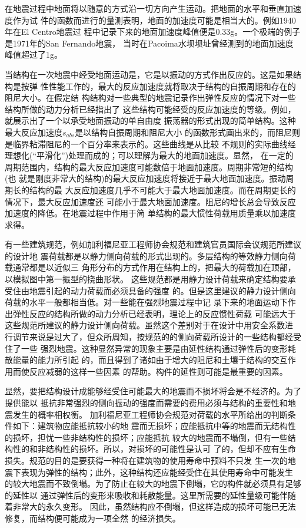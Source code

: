 \documentclass[12pt,a4paper]{book}
\begin{document}
在地震过程中地面将以随意的方式沿一切方向产生运动。把地面的水平和垂直加速度作为试
件的函数而进行的量测表明，地面的加速度可能是相当大的。例如1940年在El Centro地震过
程中记录下来的地面加速度峰值便是0.33g。一个极端的例子是1971年的San Fernando地震，
当时在Pacoima水坝坝址曾经测到的地面加速度峰值超过了1g。

当结构在一次地震中经受地面运动是，它是以振动的方式作出反应的。这是如果结构是按弹
性性能工作的，最大的反应加速度就将取决于结构的自振周期和存在的阻尼大小。在假定结
构结构对一些典型的地震记录作出弹性反应的情况下对一些结构所做的动力分析已经指出了
这些结构可能经受的反应加速度的等级。例如，就展示出了一个以承受地面振动的单自由度
振荡器的形式出现的简单结构。这种最大反应加速度$s_{abs}$是以结构自振周期和阻尼大小
的函数形式画出来的，而阻尼则是临界粘滞阻尼的一个百分率来表示的。这些曲线是从比较
不规则的实际曲线经理想化(“平滑化”)处理而成的；可以理解为最大的地面加速度。显然，
在一定的周期范围内，结构的最大反应加速度可能数倍于地面加速度。周期非常短的结构(也
就是刚度非常大的结构)的最大反应加速度将接近于最大地面加速度。振动周期长的结构的最
大反应加速度几乎不可能大于最大地面加速度。而在周期更长的情况下，最大反应加速度还
可能小于最大地面加速度。阻尼的增长总会导致反应加速度的降低。在地震过程中作用于简
单结构的最大惯性荷载用质量乘以加速度求得。

有一些建筑规范，例如加利福尼亚工程师协会规范和建筑官员国际会议规范所建议的设计地
震荷载都是以静力侧向荷载的形式出现的。多层结构的等效静力侧向荷载通常都是以近似三
角形分布的方式作用在结构上的，把最大的荷载加在顶部，以模拟图中第一振型的挠曲形状。
这些规范都是用静力设计荷载来确定结构要承受住由地震引起的动力荷载而必须具备的强度
的。但是这里建议的静力设计侧向荷载的水平一般都相当低。对一些能在强烈地震过程中记
录下来的地面运动下作出弹性反应的结构所做的动力分析已经表明，理论上的反应惯性荷载
可能远大于这些规范所建议的静力设计侧向荷载。虽然这个差别对于在设计中用安全系数进
行调节来说是过大了，但众所周知，按规范的的侧向荷载所设计的一些结构都经受住了一些
强烈地震。这种显然异常的现象主要是由延性结构通过弹性后的变形耗散能量的能力所引起
的，而且得到了诸如由于增大的阻尼和土壤于结构的交互作用而使反应减弱的这样一些因素
的帮助。构件的延性则可能是最重要的因素。

显然，要把结构设计成能够经受住可能最大的地震而不损坏将会是不经济的。为了提供能以
抵抗非常强烈的侧向振动的强度而需要的费用必须与结构的重要性和地震发生的概率相权衡。
加利福尼亚工程师协会规范对荷载的水平所给出的判断条件如下：建筑物应能抵抗较小的地
震而无损坏；应能抵抗中等的地震而无结构性的损坏，担忧一些非结构性的损坏；应能抵抗
较大的地震而不塌倒，但有一些结构性的和非结构性的损坏。所以，对损坏的可能性是认可
了的，但却不应有生命损失。规范的目的是要获得一种将在建筑物的使用寿命中预料不只发
生一次的地震下表现为弹性的结构；此外，这种结构还应能经受住在其使用寿命中可能发生
的较大地震而不致倒塌。为了防止在较大的地震下倒塌，它的构件就必须具有足够的延性以
通过弹性后的变形来吸收和耗散能量。这里所需要的延性量级可能伴随着非常大的永久变形。
因此，虽然结构应不倒塌，但这样造成的损坏可能已无法修复，而结构便可能成为一项全然
的经济损失。
\end{document}
